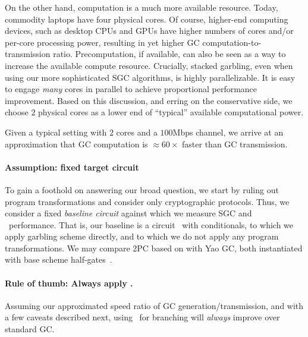 On the other hand, computation is a much more available resource.
Today, commodity laptops have four physical cores. Of course, higher-end computing devices, such as desktop CPUs and GPUs have higher numbers of cores and/or per-core processing power,
resulting in yet higher GC computation-to-transmission ratio.
Precomputation, if available, can also be seen as a way to increase
the available compute resource.
Crucially, stacked garbling,  even when using our more sophisticated SGC algorithms, is highly parallelizable.
It is easy to
engage \emph{many} cores in parallel  to achieve proportional performance improvement.
%
Based on this discussion, and erring on the conservative side, we choose $2$ physical cores as a lower end of ``typical'' available computational power. 

Given a typical setting with $2$ cores and a
$100$Mbps channel, we arrive at an approximation that GC computation
is $\approx 60 \times$ faster than GC transmission.
%

%
%






\paragraph{Assumption: fixed target circuit}
To gain a foothold on answering our broad question, we start by ruling
out program transformations and consider only cryptographic protocols.
Thus, we consider a fixed {\em baseline circuit} against which we
measure SGC and \ourschemelong\ performance.    That is, our baseline is a
circuit \cir\ with conditionals, to which we apply garbling scheme
directly, and to which we do not apply any program transformations.
We may compare 2PC based on \ourschemelong with  Yao GC, both instantiated
with base scheme half-gates~\cite{EC:ZahRosEva15}.



\paragraph{Rule of thumb: Always apply \ourschemelong.}  Assuming our
approximated speed ratio of GC generation/transmission, and with a few caveats
described next, using \ourschemelong\ for branching will {\em always}
improve over standard GC. 

